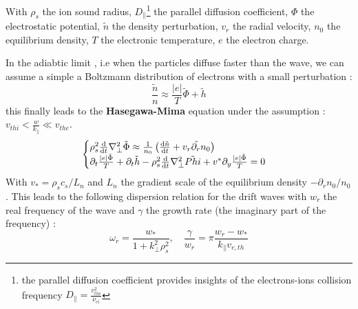 \documentclass[11pt,a4paper,openany]{report}
\begin{document}
\begin{multicols}{2}
    With $\rho_s$ the ion sound radius, $D_\parallel$\footnote{the parallel diffusion coefficient provides insights of the electrons-ions collision frequency $D_\parallel = \frac{v_{the}^2}{\nu_{ei}}$} the parallel diffusion coefficient, $\Phi$ the electrostatic potential, $\tilde{n}$ the density perturbation, $v_r$ the radial velocity, $n_0$ the equilibrium density, $T$ the electronic temperature, $e$ the electron charge.

    In the adiabtic limit \cite{Trapped_Particle_Mode}, i.e when the particles diffuse faster than the wave, we can assume a simple a Boltzmann distribution of electrons with a small perturbation :
    $$\frac{\tilde{n}}{n} \approx \frac{\vert e \vert}{T} \tilde{\Phi} + \tilde{h}$$ this finally leads to the \textbf{Hasegawa-Mima} \cite{Mima} equation under the assumption : $ v_{thi} <\frac{w}{k_\parallel} \ll v_{the}$.
    \begin{equation}
        \begin{cases}
            \rho_s^2\dv{t}\nabla_\perp^2\tilde{\Phi} \approx \frac{1}{n_0}\left(\dv{\tilde{n}}{t} + \tilde{v_r\partial_r n_0}\right) \\
            \partial_t \frac{\vert e \vert \tilde{\Phi}}{T} + \partial_t \tilde{h} - \rho_s^2\dv{t}\nabla_\perp^2\tilde{Phi}  + v^{*}\partial_y\frac{\vert e \vert \tilde{\Phi}}{T} = 0
        \end{cases}
    \end{equation}
    With $v_* = \rho_s c_s / L_n$ and $L_n$ the gradient scale of the equilibrium density $-\partial_r n_0 / n_0$. This leads to the following dispersion relation for the drift waves with $w_r$ the real frequency of the wave and $\gamma$ the growth rate (the imaginary part of the frequency) :
    $$\omega_r = \frac{w_{*}}{1 + k_\perp^2\rho_s^2}, \quad \frac{\gamma}{w_r} = \pi \frac{w_r - w_{*}}{k_\parallel v_{e,th}}$$


\end{multicols}
\end{document}
